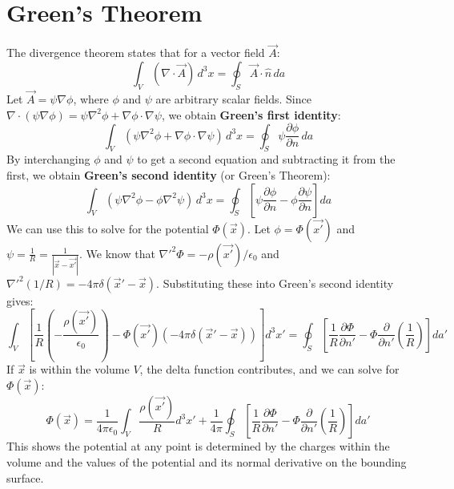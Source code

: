 \documentclass[12pt, a4paper]{article}
\begin{document}
	\section{Green's Theorem}
	The divergence theorem states that for a vector field $\vec{A}$:
	\begin{equation*}
		\int_V (\nabla \cdot \vec{A}) \,d^3x = \oint_S \vec{A} \cdot \hat{n} \,da
	\end{equation*}
	Let $\vec{A} = \psi \nabla \phi$, where $\phi$ and $\psi$ are arbitrary scalar fields. Since $\nabla \cdot (\psi\nabla\phi) = \psi\nabla^2\phi + \nabla\phi \cdot \nabla\psi$, we obtain \textbf{Green's first identity}:
	\begin{equation*}
		\int_V (\psi\nabla^2\phi + \nabla\phi \cdot \nabla\psi) \,d^3x = \oint_S \psi \frac{\partial\phi}{\partial n} \,da
	\end{equation*}
	By interchanging $\phi$ and $\psi$ to get a second equation and subtracting it from the first, we obtain \textbf{Green's second identity} (or Green's Theorem):
	\begin{equation*}
		\int_V (\psi\nabla^2\phi - \phi\nabla^2\psi) \,d^3x = \oint_S \left[\psi \frac{\partial\phi}{\partial n} - \phi \frac{\partial\psi}{\partial n}\right] da
	\end{equation*}
	We can use this to solve for the potential $\Phi(\vec{x})$. Let $\phi = \Phi(\vec{x'})$ and $\psi = \frac{1}{R} = \frac{1}{|\vec{x}-\vec{x'}|}$. We know that $\nabla'^2\Phi = -\rho(\vec{x'})/\epsilon_0$ and $\nabla'^2(1/R) = -4\pi\delta(\vec{x}'-\vec{x})$. Substituting these into Green's second identity gives:
	\begin{equation*}
		\int_V \left[\frac{1}{R} \left(-\frac{\rho(\vec{x'})}{\epsilon_0}\right) - \Phi(\vec{x'})(-4\pi\delta(\vec{x}'-\vec{x}))\right] d^3x' = \oint_S \left[\frac{1}{R} \frac{\partial\Phi}{\partial n'} - \Phi \frac{\partial}{\partial n'}\left(\frac{1}{R}\right)\right] da'
	\end{equation*}
	If $\vec{x}$ is within the volume $V$, the delta function contributes, and we can solve for $\Phi(\vec{x})$:
	\begin{equation}
		\boxed{
			\Phi(\vec{x}) = \frac{1}{4\pi\epsilon_0} \int_V \frac{\rho(\vec{x'})}{R} d^3x' + \frac{1}{4\pi} \oint_S \left[\frac{1}{R} \frac{\partial\Phi}{\partial n'} - \Phi \frac{\partial}{\partial n'}\left(\frac{1}{R}\right)\right] da'
		}
	\end{equation}
	This shows the potential at any point is determined by the charges within the volume and the values of the potential and its normal derivative on the bounding surface.
	
\end{document}

